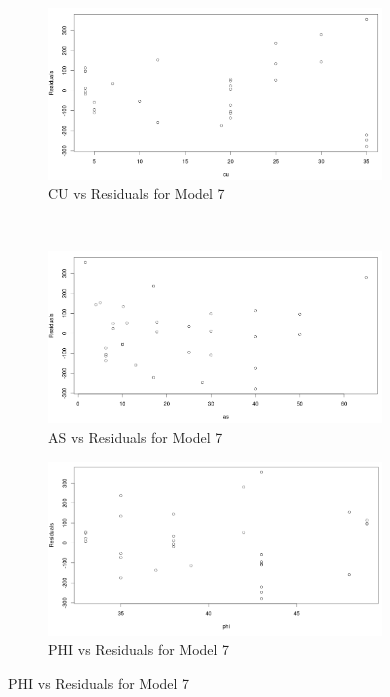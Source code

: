 \documentclass[a4paper,12pt, english]{article}
\begin{document}
\begin{figure}[H]
        \centering
        \begin{subfigure}[b]{0.795\textwidth}
                \includegraphics[width=0.96986\textwidth]{mod7-resid1}
  		\caption{CU vs Residuals for Model 7}
  		\label{fig:mod7-resid1}
        \end{subfigure}%
        ~ %
        
        \begin{subfigure}[b]{0.795\textwidth}
                \centering
  		\includegraphics[width=0.96986\textwidth]{mod7-resid2}
  		\caption{AS vs Residuals for Model 7}
  		\label{fig:mod7-resid2}
        \end{subfigure}
        
        \begin{subfigure}[b]{0.795\textwidth}
                \centering
  		\includegraphics[width=0.96986\textwidth]{mod7-resid3}
  		\caption{PHI vs Residuals for Model 7}
		  \label{fig:mod7-resid3}
        \end{subfigure}
        

\end{figure}
\end{document}

